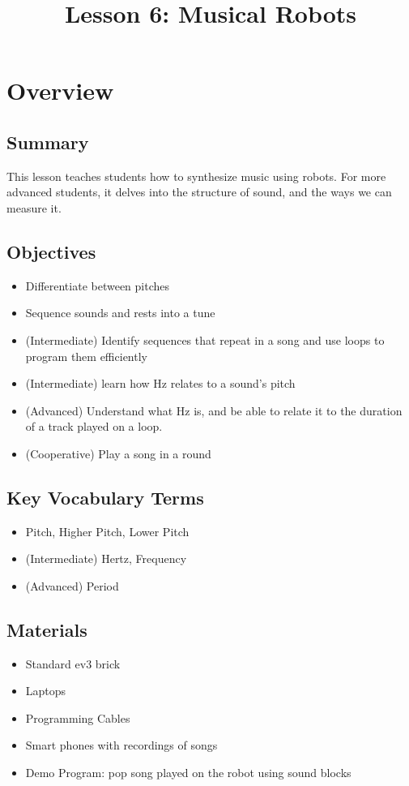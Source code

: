 \documentclass{lessonplan}
\title{Lesson 6: Musical Robots}
\author{\linkHome}
\date{}
\begin{document}
  \maketitle

  \section{Overview}
    \subsection{Summary}
      This lesson teaches students how to synthesize music using
      robots.  For more advanced students, it delves into the
      structure of sound, and the ways we can measure it.
    \subsection{Objectives}
    \begin{itemize}
      \item Differentiate between pitches
      \item Sequence sounds and rests into a tune
      \item (Intermediate) Identify sequences that repeat in a song
        and use loops to program them efficiently
      \item (Intermediate) learn how Hz relates to a sound's pitch
      \item (Advanced) Understand what Hz is, and be able to relate it
        to the duration of a track played on a loop.
      \item (Cooperative) Play a song in a round
    \end{itemize}
    \subsection{Key Vocabulary Terms}
    \begin{itemize}
      \item Pitch, Higher Pitch, Lower Pitch
      \item (Intermediate) Hertz, Frequency
      \item (Advanced) Period
    \end{itemize}
    \subsection{Materials}
      \begin{itemize}
        \item Standard ev3 brick
        \item Laptops
        \item Programming Cables
        \item Smart phones with recordings of songs
        \item Demo Program: pop song played on the robot using sound
          blocks
      \end{itemize}
\end{document}
